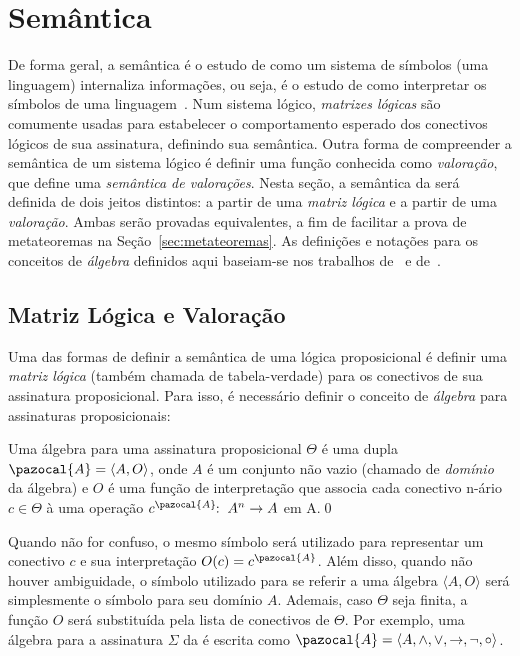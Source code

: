 \section{Semântica}
\label{sec:semantica}
    De forma geral, a semântica é o estudo de como um sistema de símbolos (uma linguagem) internaliza informações, ou seja, é o estudo de como interpretar os símbolos de uma linguagem~\cite{brown2005encyclopedia}. Num sistema lógico, \textit{matrizes lógicas} são comumente usadas para estabelecer o comportamento esperado dos conectivos lógicos de sua assinatura, definindo sua semântica. Outra forma de compreender a semântica de um sistema lógico é definir uma função conhecida como \textit{valoração}, que define uma \textit{semântica de valorações}. Nesta seção, a semântica da \lfium{} será definida de dois jeitos distintos: a partir de uma \textit{matriz lógica} e a partir de uma \textit{valoração}. Ambas serão provadas equivalentes, a fim de facilitar a prova de metateoremas na Seção~\ref{sec:metateoremas}. As definições e notações para os conceitos de \textit{álgebra} definidos aqui baseiam-se nos trabalhos de~ e de~.
    \subsection{Matriz Lógica e Valoração}
        Uma das formas de definir a semântica de uma lógica proposicional é definir uma \textit{matriz lógica} (também chamada de tabela-verdade) para os conectivos de sua assinatura proposicional. Para isso, é necessário definir o conceito de \textit{álgebra} para assinaturas proposicionais:
         

        \begin{definicao}
        \label{def:algebra}
            Uma álgebra para uma assinatura proposicional $\Theta$ é uma dupla $\pazocal{A} = \langle A, O \rangle$, onde $A$ é um conjunto não vazio (chamado de \textit{domínio} da álgebra) e $O$ é uma função de interpretação que associa cada conectivo n-ário $c \in \Theta$ à uma operação $c^{\pazocal{A}}\!\! : \; A^{n} \to A$ em A.\qed{}
        \end{definicao}

        Quando não for confuso, o mesmo símbolo será utilizado para representar um conectivo $c$ e sua interpretação $O(c) = c^{\pazocal{A}}$. Além disso, quando não houver ambiguidade, o símbolo utilizado para se referir a uma álgebra $\langle A, O \rangle$ será simplesmente o símbolo para seu domínio $A$. Ademais, caso $\Theta$ seja finita, a função $O$ será substituída pela lista de conectivos de $\Theta$. Por exemplo, uma álgebra para a assinatura $\Sigma$ da \lfium{} é escrita como $\pazocal{A} = \langle A,\land, \lor, \to, \neg, \circ \rangle$.

